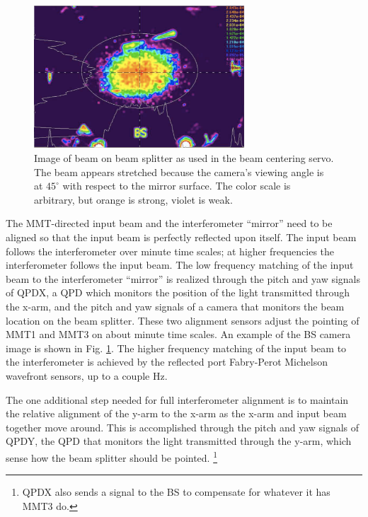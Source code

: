 \begin{figure} 
\begin{centering} \includegraphics[width=0.7\textwidth]{figures/BCSspiricon.pdf} 
\caption[Beam centering servo image of beam splitter]{Image of beam on beam splitter as used in the beam centering servo. The beam appears stretched because the camera's viewing angle is at $45^{\circ}$ with respect to the mirror surface. The color scale is arbitrary, but orange is strong, violet is weak.}
\label{fig:BCS}
\end{centering}
\end{figure}

The MMT-directed input beam and the interferometer ``mirror'' need to be aligned so that the input beam is perfectly reflected upon itself. The input beam follows the interferometer over minute time scales; at higher frequencies the interferometer follows the input beam. The low frequency matching of the input beam to the interferometer ``mirror'' is realized through the pitch and yaw signals of QPDX, a QPD which monitors the position of the light transmitted through the x-arm, and the pitch and yaw signals of a camera that monitors the beam location on the beam splitter. These two alignment sensors adjust the pointing of MMT1 and MMT3 on about minute time scales. An example of the BS camera image is shown in Fig. \ref{fig:BCS}. The higher frequency matching of the input beam to the interferometer is achieved by the reflected port Fabry-Perot Michelson wavefront sensors, up to a couple Hz.

The one additional step needed for full interferometer alignment is to maintain the relative alignment of the y-arm to the x-arm as the x-arm and input beam together move around. This is accomplished through the pitch and yaw signals of QPDY, the QPD that monitors the light transmitted through the y-arm, which sense how the beam splitter should be pointed. \footnote{QPDX also sends a signal to the BS to compensate for whatever it has MMT3 do.}

